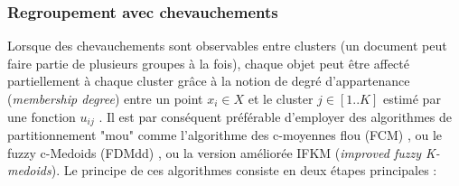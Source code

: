 
\subsubsection{Regroupement avec chevauchements}

Lorsque des chevauchements sont observables entre clusters (un document peut faire partie de plusieurs groupes à la fois), chaque objet peut être affecté partiellement à chaque cluster grâce à la notion de degré d'appartenance (\textit{membership degree}) entre un point $x_i \in X$ et le cluster $j \in [1..K]$ estimé par une fonction $u_{ij}$  \citep{baraldi1999surveyfuzzyclstering}. Il est par conséquent préférable d'employer des algorithmes de partitionnement "mou" comme l'algorithme des c-moyennes flou (FCM) \citep{bezdek1984fcm, hathaway1989fuzzycmeans}, ou le fuzzy c-Medoids (FDMdd) \citep{krishnapuram2001fuzzycmedoids}, ou la version améliorée IFKM (\textit{improved fuzzy K-medoids})\citep{sabzi2011fuzzykmedoids}.  Le principe de ces algorithmes consiste en deux étapes principales \citep{sabzi2011fuzzykmedoids}: 

